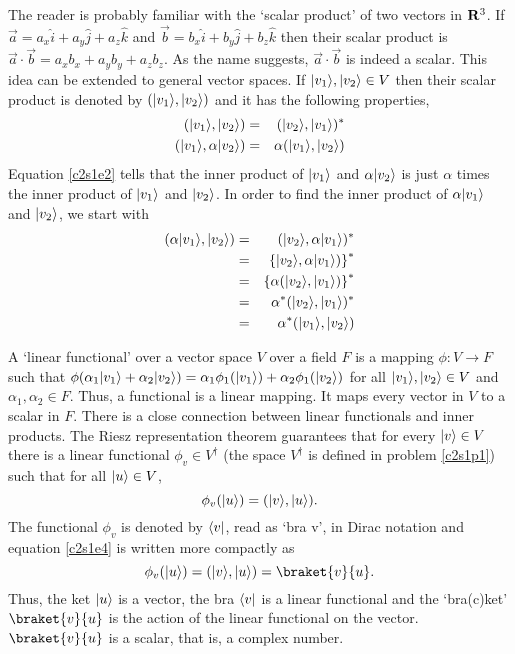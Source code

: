 The reader is probably familiar with the `scalar product' of two vectors in
$\mathbf{R}^3$. If $\vec{a} = a_x\hat{i} + a_y\hat{j} + a_z\hat{k}$ and $\vec{b} =
b_x\hat{i} + b_y\hat{j} + b_z\hat{k}$ then their scalar product is $\vec{a}
\cdot\vec{b} = a_xb_x + a_yb_y + a_zb_z$. As the name suggests, $\vec{a}\cdot
\vec{b}$ is indeed a scalar. This idea can be extended to general vector spaces.
If $\lvert v_1\rangle, \lvert v_2\rangle \in V$ then their scalar product is denoted by 
$(\lvert v_1\rangle, \lvert v_2\rangle)$ and it has the following properties,
\begin{eqnarray}
(\lvert v_1\rangle, \lvert v_2\rangle) &=& (\lvert v_2\rangle, \lvert v_1\rangle)^\ast \label{c2s1e1} \\
(\lvert v_1\rangle, \alpha\lvert v_2\rangle) &=& \alpha (\lvert v_1\rangle, \lvert v_2\rangle) \label{c2s1e2} 
\end{eqnarray}
Equation \eqref{c2s1e2} tells that the inner product of $\lvert v_1\rangle$ and
$\alpha\lvert v_2\rangle$ is just $\alpha$ times the inner product of $\lvert v_1\rangle$
and $\lvert v_2\rangle$. In order to find the inner product of $\alpha\lvert v_1\rangle$
and $\lvert v_2\rangle$, we start with
\begin{eqnarray}
(\alpha\lvert v_1\rangle, \lvert v_2\rangle) &=& (\lvert v_2\rangle, \alpha\lvert v_1\rangle)^\ast \nonumber \\
 &=& \left\{\lvert v_2\rangle, \alpha\lvert v_1\rangle)\right\}^\ast \nonumber \\
 &=& \left\{\alpha(\lvert v_2\rangle, \lvert v_1\rangle)\right\}^\ast \nonumber \\
 &=& \alpha^\ast(\lvert v_2\rangle, \lvert v_1\rangle)^\ast \nonumber \\
 &=& \alpha^\ast (\lvert v_1\rangle, \lvert v_2\rangle) \label{c2s1e3}
\end{eqnarray}


A `linear functional' over a vector space $V$ over a field $F$ is a mapping
$\phi: V \rightarrow F$ such that $\phi(\alpha_1\lvert v_1\rangle + \alpha_2\lvert v_2\rangle)
= \alpha_1\phi_1(\lvert v_1\rangle) + \alpha_2\phi_1(\lvert v_2\rangle)$ for all $\lvert v_1\rangle,
\lvert v_2\rangle \in V$ and $\alpha_1, \alpha_2 \in F$. Thus, a functional is a linear
mapping. It maps every vector in $V$ to a scalar in $F$. There is a close
connection between linear functionals and inner products. The Riesz representation
theorem \cite{kreyszig1978introductory} guarantees that for every $\lvert v\rangle \in V$
there is a linear functional $\phi_v \in V^\dagger$ (the space $V^\dagger$ is
defined in problem \ref{c2s1p1}) such that for all $\lvert u\rangle \in V$,
\begin{equation}\label{c2s1e4}
\phi_v(\lvert u\rangle) = (\lvert v\rangle, \lvert u\rangle).
\end{equation}
The functional $\phi_v$ is denoted by $\langle v\rvert$, read as `bra v', in Dirac 
notation and equation \eqref{c2s1e4} is written more compactly as
\begin{equation}\label{c2e1e5}
\phi_v(\ket{u}) = (\ket{v}, \ket{u}) = \braket{v}{u}.
\end{equation}
Thus, the ket $\lvert u\rangle$ is a vector, the bra $\langle v\rvert$ is a linear functional 
and the `bra(c)ket' $\braket{v}{u}$ is the action of the linear functional on
the vector. $\braket{v}{u}$ is a scalar, that is, a complex number.

